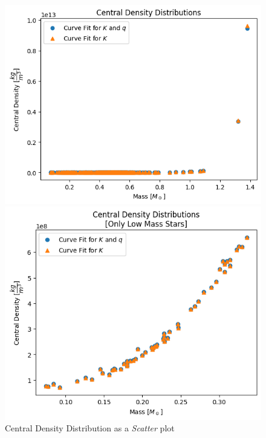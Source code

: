 \documentclass[letterpaper,12pt]{article}
\begin{document}
\begin{figure}[H]
\begin{minipage}{.5\textwidth}
\centerline{\includegraphics[width=\linewidth]{figures/appendix/2_1_3_n_s_rho_m.png}}
\end{minipage}
\begin{minipage}{.5\textwidth}
\centerline{\includegraphics[width=\linewidth]{figures/appendix/2_1_4_n_s_rho_m_.png}}
\end{minipage}
\caption{Central Density Distribution as a \textit{Scatter} plot}
\end{figure}
\end{document}

